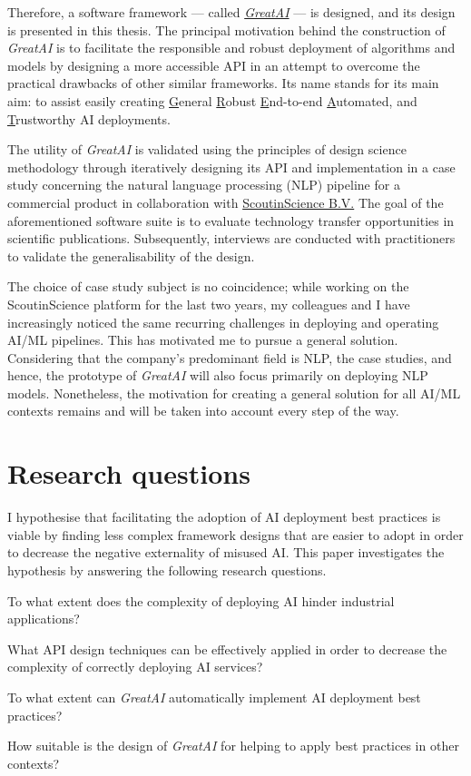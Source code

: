 Therefore, a software framework --- called \href{https://github.com/schmelczer/great-ai}{\textit{GreatAI}} --- is designed, and its design is presented in this thesis. The principal motivation behind the construction of \textit{GreatAI} is to facilitate the responsible and robust deployment of algorithms and models by designing a more accessible API in an attempt to overcome the practical drawbacks of other similar frameworks. Its name stands for its main aim: to assist easily creating \underline{G}eneral \underline{R}obust \underline{E}nd-to-end \underline{A}utomated, and \underline{T}rustworthy AI deployments.

The utility of \textit{GreatAI} is validated using the principles of design science methodology \cite{wieringa2014design} through iteratively designing its API and implementation in a case study concerning the natural language processing (NLP) pipeline for a commercial product in collaboration with \href{https://scoutinscience.com/}{ScoutinScience B.V.} The goal of the aforementioned software suite is to evaluate technology transfer opportunities in scientific publications. Subsequently, interviews are conducted with practitioners to validate the generalisability of the design.

The choice of case study subject is no coincidence; while working on the ScoutinScience platform for the last two years, my colleagues and I have increasingly noticed the same recurring challenges in deploying and operating AI/ML pipelines. This has motivated me to pursue a general solution. Considering that the company's predominant field is NLP, the case studies, and hence, the prototype of \textit{GreatAI} will also focus primarily on deploying NLP models. Nonetheless, the motivation for creating a general solution for all AI/ML contexts remains and will be taken into account every step of the way.

\section{Research questions}

I hypothesise that facilitating the adoption of AI deployment best practices is viable by finding less complex framework designs that are easier to adopt in order to decrease the negative externality of misused AI. This paper investigates the hypothesis by answering the following research questions. 

\begin{rqlist}
  \item To what extent does the complexity of deploying AI hinder industrial applications?
  \item What API design techniques can be effectively applied in order to decrease the complexity of correctly deploying AI services?
  \item To what extent can \textit{GreatAI} automatically implement AI deployment best practices?
  \item How suitable is the design of \textit{GreatAI} for helping to apply best practices in other contexts?
\end{rqlist}

